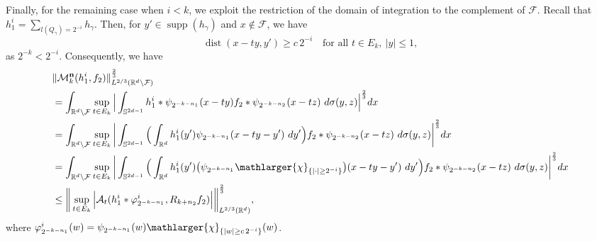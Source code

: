 \documentclass[a4paper,reqno]{amsart}
\numberwithin{equation}{section}
\newcommand{\R}{{\mathbb {R}}}
\newcommand{\supp}{\operatorname{supp}}
\begin{document}
	Finally, for the remaining case when $i<k$, we exploit the restriction of the domain of integration to the complement of $\mathcal{F}$. Recall that $h^{i}_{1}=\sum\limits_{l(Q_{\gamma})=2^{-i}}h_{\gamma}$. Then, for $y'\in \supp(h_{\gamma})$ and $x\notin \mathcal{F}$, we have  
	\[\operatorname{dist}(x-ty, y')\geq c\,2^{-i}\quad \text{for all }t\in E_k,~ |y|\leq1,\]
	as $2^{-k}<2^{-i}$. Consequently, we have
	\begin{align*}
		&\|\mathcal{M}^{\mathbf{n}}_k(h^{i}_1,f_2)\|_{L^{2/3}(\mathbb{R}^{d}\setminus\mathcal{F})}^\frac{2}{3}\\
		&=\int_{\mathbb{R}^{d}\setminus\mathcal{F}}\sup_{t\in E_k}\Big|\int_{\mathbb{S}^{2d-1}}h_1^i\ast\psi_{2^{-k-n_1}}(x-ty)f_2\ast\psi_{2^{-k-n_2}}(x-tz)~d\sigma(y,z)\Big|^{\frac{2}{3}}dx\\
		&=\int_{\mathbb{R}^{d}\setminus\mathcal{F}}\sup_{t\in E_k}\bigg|\int_{\mathbb{S}^{2d-1}}\Big(\int_{\R^d}h_1^i(y')\psi_{2^{-k-n_1}}(x-ty-y')~dy'\Big)f_2\ast\psi_{2^{-k-n_2}}(x-tz)~d\sigma(y,z)\bigg|^{\frac{2}{3}}dx\\
		&=\int_{\mathbb{R}^{d}\setminus\mathcal{F}}\sup_{t\in E_k}\bigg|\int_{\mathbb{S}^{2d-1}}\Big(\int_{\R^d}h_1^i(y')\big(\psi_{2^{-k-n_1}}\mathlarger{\chi}_{\{|\cdot|\geq 2^{-i}\}}\big)(x-ty-y')~dy'\Big)f_2\ast\psi_{2^{-k-n_2}}(x-tz)~d\sigma(y,z)\bigg|^{\frac{2}{3}}dx\\
		&\leq\bigg\|\sup_{t\in E_k}\Big|\mathcal{A}_t(h^{i}_1\ast\varphi_{2^{-k-n_1}}^i,R_{k+n_2}f_2)\Big|\bigg\|_{L^{2/3}(\mathbb{R}^{d})}^\frac{2}{3},
	\end{align*}
	where $\varphi_{2^{-k-n_1}}^i(w)=\psi_{2^{-k-n_1}}(w)\mathlarger{\chi}_{\{|w|\geq c\,2^{-i}\}}(w)$.
	
\end{document}
